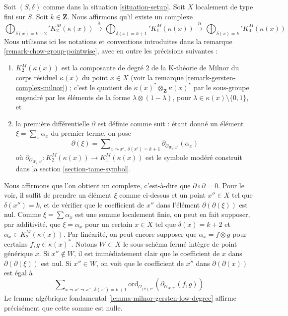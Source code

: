 \begin{remark}
\label{remark-higher-chow-pointwise}
Soit $(S, \delta)$ comme dans la situation \ref{situation-setup}.
Soit $X$ localement de type fini sur $S$. Soit $k \in \mathbf{Z}$.
Nous affirmons qu'il existe un complexe
$$
\bigoplus\nolimits_{\delta(x) = k + 2}' K_2^M(\kappa(x))
\xrightarrow{\partial}
\bigoplus\nolimits_{\delta(x) = k + 1}' K_1^M(\kappa(x))
\xrightarrow{\partial}
\bigoplus\nolimits_{\delta(x) = k}' K_0^M(\kappa(x))
$$
Nous utilisons ici les notations et conventions introduites dans la
remarque \ref{remark-chow-group-pointwise}, avec en outre les précisions suivantes :
\begin{enumerate}
\item $K_2^M(\kappa(x))$ est la composante de degré $2$ de
la K-théorie de Milnor du corps résiduel $\kappa(x)$ du point
$x \in X$ (voir la remarque \ref{remark-gersten-complex-milnor}) ; c'est
le quotient de $\kappa(x)^* \otimes_\mathbf{Z} \kappa(x)^*$
par le sous-groupe engendré par les éléments de la forme
$\lambda \otimes (1 - \lambda)$, pour
$\lambda \in \kappa(x) \setminus \{0, 1\}$, et
\item la première différentielle $\partial$ est définie comme suit :
étant donné un élément $\xi = \sum_x \alpha_x$ du premier terme,
on pose
$$
\partial(\xi) = \sum\nolimits_{x \leadsto x',\ \delta(x') = k + 1}
\partial_{\mathcal{O}_{W_x, x'}}(\alpha_x)
$$
où
$\partial_{\mathcal{O}_{W_x, x'}} : K_2^M(\kappa(x)) \to K_1^M(\kappa(x))$
est le symbole modéré construit dans la section \ref{section-tame-symbol}.
\end{enumerate}
Nous affirmons que l'on obtient un complexe, c'est-à-dire que $\partial \circ \partial = 0$.
Pour le voir, il suffit de prendre un élément $\xi$ comme ci-dessus et un point
$x'' \in X$ tel que $\delta(x'') = k$, et de vérifier que le coefficient de
$x''$ dans l'élément $\partial(\partial(\xi))$ est nul.
Comme $\xi = \sum \alpha_x$ est une somme localement finie, on
peut en fait supposer, par additivité, que $\xi = \alpha_x$ pour
un certain $x \in X$ tel que $\delta(x) = k + 2$ et $\alpha_x \in K_2^M(\kappa(x))$.
Par linéarité, on peut encore supposer que $\alpha_x = f \otimes g$ pour
certains $f, g \in \kappa(x)^*$. Notons $W \subset X$ le sous-schéma fermé
intègre de point générique $x$. Si $x'' \not \in W$, il est
immédiatement clair que le coefficient de $x$ dans $\partial(\partial(\xi))$
est nul. Si $x'' \in W$, on voit que le coefficient de $x''$
dans $\partial(\partial(x))$ est égal à
$$
\sum\nolimits_{x \leadsto x' \leadsto x'',\ \delta(x') = k + 1}
\text{ord}_{\mathcal{O}_{\overline{\{x'\}}, x''}}(
\partial_{\mathcal{O}_{W, x'}}(f, g))
$$
Le lemme algébrique fondamental \ref{lemma-milnor-gersten-low-degree}
affirme précisément que cette somme est nulle.
\end{remark}

